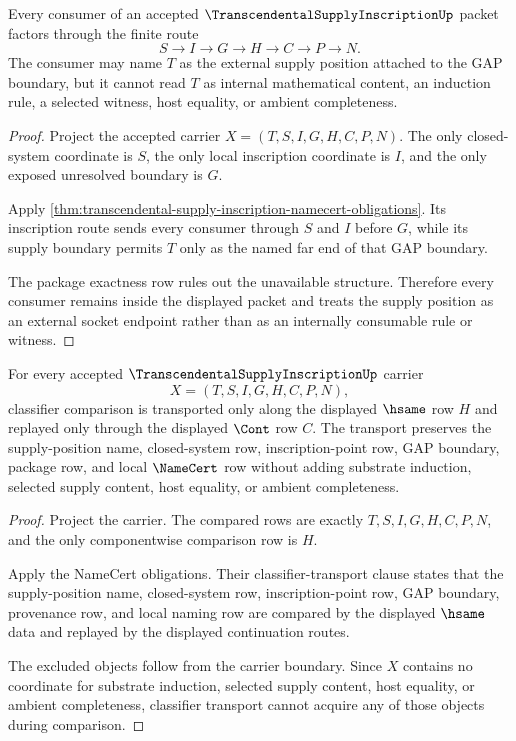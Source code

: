 \begin{theorem}
\label{thm:transcendental-supply-inscription-non-escape-boundary}
Every consumer of an accepted $\TranscendentalSupplyInscriptionUp$ packet factors through the finite route
$$
S \to I \to G \to H \to C \to P \to N.
$$
The consumer may name $T$ as the external supply position attached to the GAP boundary, but it cannot read $T$ as internal mathematical content, an induction rule, a selected witness, host equality, or ambient completeness.
\end{theorem}
\begin{proof}
Project the accepted carrier $X=(T,S,I,G,H,C,P,N)$. The only closed-system coordinate is $S$, the only local inscription coordinate is $I$, and the only exposed unresolved boundary is $G$.

Apply \autoref{thm:transcendental-supply-inscription-namecert-obligations}. Its inscription route sends every consumer through $S$ and $I$ before $G$, while its supply boundary permits $T$ only as the named far end of that GAP boundary.

The package exactness row rules out the unavailable structure. Therefore every consumer remains inside the displayed packet and treats the supply position as an external socket endpoint rather than as an internally consumable rule or witness.
\end{proof}

\begin{theorem}
\label{thm:transcendental-supply-inscription-classifier-transport}
For every accepted $\TranscendentalSupplyInscriptionUp$ carrier
$$
X=(T,S,I,G,H,C,P,N),
$$
classifier comparison is transported only along the displayed $\hsame$ row $H$ and replayed only through the displayed $\Cont$ row $C$. The transport preserves the supply-position name, closed-system row, inscription-point row, GAP boundary, package row, and local $\NameCert$ row without adding substrate induction, selected supply content, host equality, or ambient completeness.
\end{theorem}
\begin{proof}
Project the carrier. The compared rows are exactly $T,S,I,G,H,C,P,N$, and the only componentwise comparison row is $H$.

Apply the NameCert obligations. Their classifier-transport clause states that the supply-position name, closed-system row, inscription-point row, GAP boundary, provenance row, and local naming row are compared by the displayed $\hsame$ data and replayed by the displayed continuation routes.

The excluded objects follow from the carrier boundary. Since $X$ contains no coordinate for substrate induction, selected supply content, host equality, or ambient completeness, classifier transport cannot acquire any of those objects during comparison.
\end{proof}

